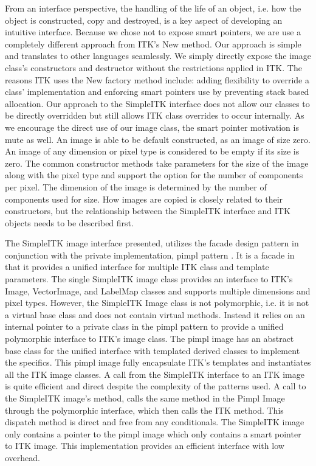 \documentclass{frontiersMED} %
\begin{document}
From an interface perspective, the handling of the life of an object,
i.e. how the object is constructed, copy and destroyed, is a key
aspect of developing an intuitive interface. Because we chose not to
expose smart pointers, we are use a completely different approach from
ITK’s New method. Our approach is simple and translates to other
languages seamlessly. We simply directly expose the image class’s
constructors and destructor without the restrictions applied in
ITK. The reasons ITK uses the New factory method include: adding
flexibility to override a class’ implementation and enforcing smart
pointers use by preventing stack based allocation. Our approach to the
SimpleITK interface does not allow our classes to be directly
overridden but still allows ITK class overrides to occur
internally. As we encourage the direct use of our image class, the
smart pointer motivation is mute as well. An image is able to be
default constructed, as an image of size zero. An image of any
dimension or pixel type is considered to be empty if its size is
zero. The common constructor methods take parameters for the size of
the image along with the pixel type and support the option for the
number of components per pixel. The dimension of the image is
determined by the number of components used for size. How images are
copied is closely related to their constructors, but the relationship
between the SimpleITK interface and ITK objects needs to be described
first.

The SimpleITK image interface presented, utilizes the facade design
pattern in conjunction with the private implementation, pimpl pattern
\cite{Sutter1999}. It is a facade in that it provides a unified interface
for multiple ITK class and template parameters. The single SimpleITK
image class provides an interface to ITK’s Image, VectorImage, and
LabelMap classes and supports  multiple dimensions and pixel
types. However, the SimpleITK Image class is not polymorphic, i.e. it
is not a virtual base class and does not contain virtual
methods. Instead it relies on an internal pointer to a private class
in the pimpl pattern to provide a unified polymorphic interface to
ITK’s image class. The pimpl image has an abstract base class for the
unified interface with templated derived classes to implement the
specifics. This pimpl image fully encapsulate ITK’s templates and
instantiates all the ITK image classes. A call from the SimpleITK
interface to an ITK image is quite efficient and direct despite the
complexity of the patterns used. A call to the SimpleITK image’s
method, calls the same method in the Pimpl Image through the
polymorphic interface, which then calls the ITK method. This dispatch
method is direct and free from any conditionals. The SimpleITK image
only contains a pointer to the pimpl image which only contains a smart
pointer to ITK image. This implementation provides an efficient
interface with low overhead.
\end{document}
